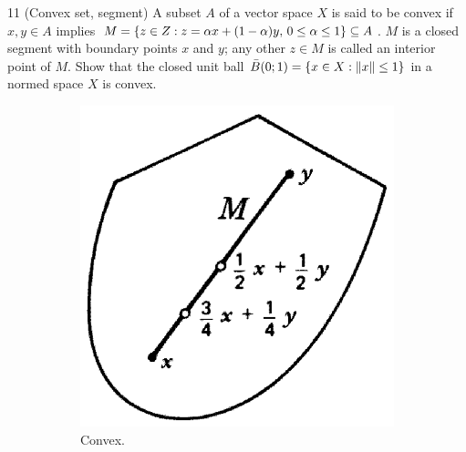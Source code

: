 \begin{exercise}{11 (Convex set, segment)}
A subset $A$ of a vector space $X$ is said to be convex if $x,y\in A$ implies $M=\{z\in Z: z=\alpha x+(1-\alpha)y,\, 0\leq\alpha\leq 1\}\subseteq A$. $M$ is a closed segment with boundary points $x$ and $y$; any other $z\in M$ is called an interior point of $M$. Show that the closed unit ball $\bar{B}(0;1)=\{x\in X: \left\lVert x\right\rVert\leq 1\}$ in a normed space $X$ is convex.
\begin{figure}[H]
     \centering
     \begin{subfigure}[b]{0.45\textwidth}
         \centering
         \includegraphics[width=\textwidth]{kreyszig/assets/sec2-2-ex11-a.png}
         \caption{Convex.}
         \label{fig:sec2-2-ex11-a}
     \end{subfigure}
     \hfill
     \begin{subfigure}[b]{0.45\textwidth}
         \centering

\end{subfigure}
\end{figure}
\end{exercise}
